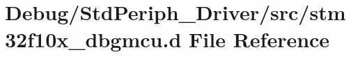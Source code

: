 \hypertarget{stm32f10x__dbgmcu_8d}{}\section{Debug/\+Std\+Periph\+\_\+\+Driver/src/stm32f10x\+\_\+dbgmcu.d File Reference}
\label{stm32f10x__dbgmcu_8d}

